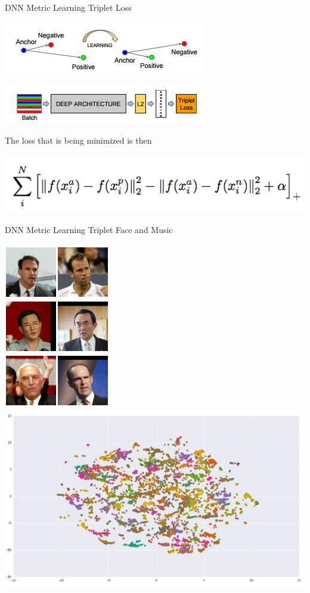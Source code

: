 \documentclass{beamer}
\begin{document}
\begin{frame}{DNN Metric Learning Triplet Loss}
	\pause
			 \begin{center}
			 	\includegraphics[scale=0.7]{img/ns}
			 \end{center}
	\pause
		 \begin{center}
		 	\includegraphics[scale=0.7]{img/tl2}
		 \end{center}
\pause The loss that is being minimized is then 
	 \begin{center}
	 	\pause \includegraphics[scale=0.4]{img/tl}
	 \end{center}
\end{frame}

\begin{frame}{DNN Metric Learning Triplet Face and Music}
		 \begin{center}
		 	\pause\includegraphics[scale=0.5]{img/face1} \pause\includegraphics[scale=0.3]{img/music}
		 \end{center}
\end{frame}
\end{document}
